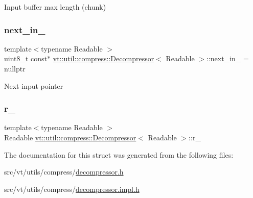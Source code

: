 Input buffer max length (chunk) \mbox{\label{structvt_1_1util_1_1compress_1_1_decompressor_a466a4d462c81a5032753fdfc11bfd54c}} 
\subsubsection{\texorpdfstring{next\+\_\+in\+\_\+}{next\_in\_}}
{\footnotesize\ttfamily template$<$typename Readable $>$ \\
uint8\+\_\+t const$\ast$ \hyperlink{structvt_1_1util_1_1compress_1_1_decompressor}{vt\+::util\+::compress\+::\+Decompressor}$<$ Readable $>$\+::next\+\_\+in\+\_\+ = nullptr\hspace{0.3cm}{\ttfamily [private]}}

Next input pointer \mbox{\label{structvt_1_1util_1_1compress_1_1_decompressor_a1a6c6dcbc87b9d96ff849e745b587f20}} 
\subsubsection{\texorpdfstring{r\+\_\+}{r\_}}
{\footnotesize\ttfamily template$<$typename Readable $>$ \\
Readable \hyperlink{structvt_1_1util_1_1compress_1_1_decompressor}{vt\+::util\+::compress\+::\+Decompressor}$<$ Readable $>$\+::r\+\_\+\hspace{0.3cm}{\ttfamily [private]}}



The documentation for this struct was generated from the following files\+:\begin{DoxyCompactItemize}
\item 
src/vt/utils/compress/\hyperlink{decompressor_8h}{decompressor.\+h}\item 
src/vt/utils/compress/\hyperlink{decompressor_8impl_8h}{decompressor.\+impl.\+h}\end{DoxyCompactItemize}
